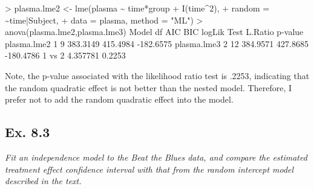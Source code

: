 \documentclass[
]{article}
\newenvironment{Shaded}{\begin{snugshade}}{\end{snugshade}}
\newcommand{\AttributeTok}[1]{\textcolor[rgb]{0.77,0.63,0.00}{#1}}
\newcommand{\DecValTok}[1]{\textcolor[rgb]{0.00,0.00,0.81}{#1}}
\newcommand{\FloatTok}[1]{\textcolor[rgb]{0.00,0.00,0.81}{#1}}
\newcommand{\FunctionTok}[1]{\textcolor[rgb]{0.00,0.00,0.00}{#1}}
\newcommand{\NormalTok}[1]{#1}
\newcommand{\OtherTok}[1]{\textcolor[rgb]{0.56,0.35,0.01}{#1}}
\newcommand{\SpecialCharTok}[1]{\textcolor[rgb]{0.00,0.00,0.00}{#1}}
\newcommand{\StringTok}[1]{\textcolor[rgb]{0.31,0.60,0.02}{#1}}
\begin{document}
\begin{Shaded}
\begin{Highlighting}[]
\SpecialCharTok{\textgreater{}}\NormalTok{ plasma.lme2 }\OtherTok{\textless{}{-}} \FunctionTok{lme}\NormalTok{(plasma }\SpecialCharTok{\textasciitilde{}}\NormalTok{ time}\SpecialCharTok{*}\NormalTok{group }\SpecialCharTok{+} \FunctionTok{I}\NormalTok{(time}\SpecialCharTok{\^{}}\DecValTok{2}\NormalTok{),}
\SpecialCharTok{+}                    \AttributeTok{random =} \SpecialCharTok{\textasciitilde{}}\NormalTok{time}\SpecialCharTok{|}\NormalTok{Subject,}
\SpecialCharTok{+}                    \AttributeTok{data =}\NormalTok{ plasma, }\AttributeTok{method =} \StringTok{"ML"}\NormalTok{)}
\SpecialCharTok{\textgreater{}} \FunctionTok{anova}\NormalTok{(plasma.lme2,plasma.lme3)}
\NormalTok{            Model df      AIC      BIC    logLik   Test  L.Ratio p}\SpecialCharTok{{-}}\NormalTok{value}
\NormalTok{plasma.lme2     }\DecValTok{1}  \DecValTok{9} \FloatTok{383.3149} \FloatTok{415.4984} \SpecialCharTok{{-}}\FloatTok{182.6575}                        
\NormalTok{plasma.lme3     }\DecValTok{2} \DecValTok{12} \FloatTok{384.9571} \FloatTok{427.8685} \SpecialCharTok{{-}}\FloatTok{180.4786} \DecValTok{1}\NormalTok{ vs }\DecValTok{2} \FloatTok{4.357781}  \FloatTok{0.2253}
\end{Highlighting}
\end{Shaded}

Note, the p-value associated with the likelihood ratio test is .2253,
indicating that the random quadratic effect is not better than the
nested model. Therefore, I prefer not to add the random quadratic effect
into the model.

\hypertarget{ex.-8.3}{%
\subsection{Ex. 8.3}\label{ex.-8.3}}

\emph{Fit an independence model to the Beat the Blues data, and compare
the estimated treatment effect confidence interval with that from the
random intercept model described in the text.}
\end{document}
